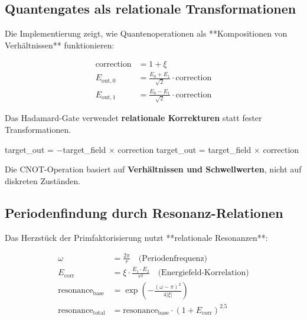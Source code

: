 	\subsection{Quantengates als relationale Transformationen}
	
	Die Implementierung zeigt, wie Quantenoperationen als **Kompositionen von Verhältnissen** funktionieren:
	
	\begin{example}
		\begin{align}
			\text{correction} &= 1 + \xi \\
			E_{\text{out},0} &= \frac{E_0 + E_1}{\sqrt{2}} \cdot \text{correction} \\
			E_{\text{out},1} &= \frac{E_0 - E_1}{\sqrt{2}} \cdot \text{correction}
		\end{align}
		
		Das Hadamard-Gate verwendet \textbf{relationale Korrekturen} statt fester Transformationen.
	\end{example}
	
	\begin{example}
		\begin{algorithmic}[1]
			\STATE target\_out = $-$target\_field $\times$ correction
			\ELSE
			\STATE target\_out = target\_field $\times$ correction
			\ENDIF
		\end{algorithmic}
		
		Die CNOT-Operation basiert auf \textbf{Verhältnissen und Schwellwerten}, nicht auf diskreten Zuständen.
	\end{example}
	
	\subsection{Periodenfindung durch Resonanz-Relationen}
	
	Das Herzstück der Primfaktorisierung nutzt **relationale Resonanzen**:
	
	\begin{align}
		\omega &= \frac{2\pi}{r} \quad \text{(Periodenfrequenz)} \\
		E_{\text{corr}} &= \xi \cdot \frac{E_1 \cdot E_2}{r^2} \quad \text{(Energiefeld-Korrelation)} \\
		\text{resonance}_{\text{base}} &= \exp\left(-\frac{(\omega - \pi)^2}{4|\xi|}\right) \\
		\text{resonance}_{\text{total}} &= \text{resonance}_{\text{base}} \cdot (1 + E_{\text{corr}})^{2.5}
	\end{align}
	
